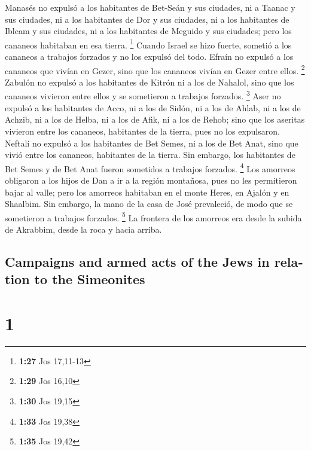 \begin{paracol}{2}
 Manasés no expulsó a los habitantes de Bet-Seán y sus
ciudades, ni a Taanac y sus ciudades, ni a los habitantes de Dor y sus
ciudades, ni a los habitantes de Ibleam y sus ciudades, ni a los
habitantes de Meguido y sus ciudades; pero los cananeos habitaban en esa
tierra. \footnote{\textbf{1:27} Jos 17,11-13}  Cuando
Israel se hizo fuerte, sometió a los cananeos a trabajos forzados y no
los expulsó del todo.  Efraín no expulsó a los cananeos
que vivían en Gezer, sino que los cananeos vivían en Gezer entre ellos.
\footnote{\textbf{1:29} Jos 16,10}  Zabulón no expulsó a
los habitantes de Kitrón ni a los de Nahalol, sino que los cananeos
vivieron entre ellos y se sometieron a trabajos forzados. \footnote{\textbf{1:30}
  Jos 19,15}  Aser no expulsó a los habitantes de Acco,
ni a los de Sidón, ni a los de Ahlab, ni a los de Achzib, ni a los de
Helba, ni a los de Afik, ni a los de Rehob;  sino que los
aseritas vivieron entre los cananeos, habitantes de la tierra, pues no
los expulsaron.  Neftalí no expulsó a los habitantes de
Bet Semes, ni a los de Bet Anat, sino que vivió entre los cananeos,
habitantes de la tierra. Sin embargo, los habitantes de Bet Semes y de
Bet Anat fueron sometidos a trabajos forzados. \footnote{\textbf{1:33}
  Jos 19,38}  Los amorreos obligaron a los hijos de Dan a
ir a la región montañosa, pues no les permitieron bajar al valle;
 pero los amorreos habitaban en el monte Heres, en Ajalón
y en Shaalbim. Sin embargo, la mano de la casa de José prevaleció, de
modo que se sometieron a trabajos forzados. \footnote{\textbf{1:35} Jos
  19,42}  La frontera de los amorreos era desde la subida
de Akrabbim, desde la roca y hacia arriba.

\switchcolumn
\begin{otherlanguage}{english}

\hypertarget{campaigns-and-armed-acts-of-the-jews-in-relation-to-the-simeonites}{%
\subsection{Campaigns and armed acts of the Jews in relation to the
Simeonites}\label{campaigns-and-armed-acts-of-the-jews-in-relation-to-the-simeonites}}

\hypertarget{section-1}{%
\section{1}\label{section-1}}


\end{otherlanguage}
\end{paracol}
